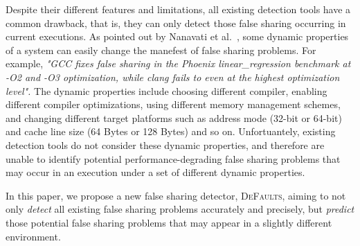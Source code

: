\documentclass[10pt]{sigplanconf}
\newcommand{\defaults}{{\scshape DeFaults}}
\begin{document}
Despite their different features and limitations, all existing detection tools 
have a common drawback, that is, they can only detect those
false sharing occurring in current executions.
As pointed out by Nanavati et al.~\cite{OSdetection}, some dynamic properties of a system can easily 
change the manefest of false sharing problems. For example, 
{\it "GCC fixes false sharing in the Phoenix linear\_regression benchmark 
at -O2 and -O3 optimization, while clang fails to even at the highest
optimization level".} 
The dynamic properties include choosing different compiler, 
enabling different compiler optimizations, 
using different memory management schemes,
and changing different target platforms such as address mode (32-bit or 64-bit) and cache line
size (64 Bytes or 128 Bytes) and so on. Unfortuantely, 
existing detection tools do not consider these dynamic properties, and
therefore are unable to identify potential performance-degrading false
sharing problems that may occur in an execution under a set of different 
dynamic properties.

In this paper, we propose a new false sharing detector, \defaults{}, aiming to
not only {\it detect} all existing false sharing problems accurately and precisely,
but {\it predict} those potential 
false sharing problems that may appear in a slightly different environment. 
\end{document}
